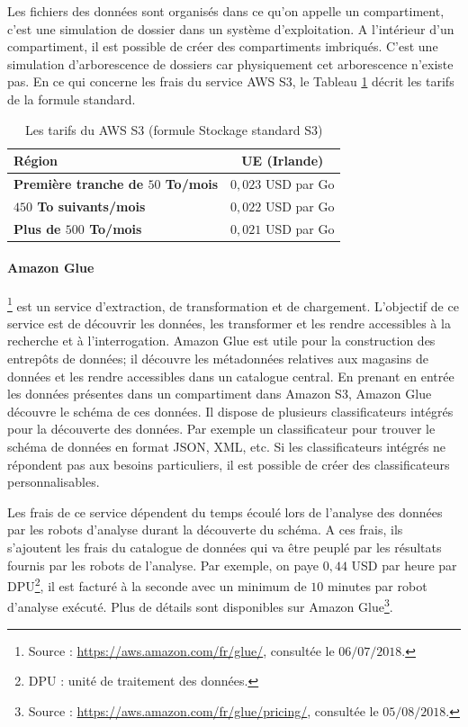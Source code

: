 Les fichiers des données sont organisés dans ce qu'on appelle un compartiment, c'est une simulation de dossier dans un système d'exploitation. A l'intérieur d'un compartiment, il est possible de créer des compartiments imbriqués. C'est une simulation d'arborescence de dossiers car physiquement cet arborescence n'existe pas. En ce qui concerne les frais du service AWS S3, le Tableau   	\ref{tab:pricing-s3-standard} décrit les tarifs de la formule standard.
\begin{table}[H]
	\centering
	\captionsetup{justification=centering}
	\begin{tabular}{l c }
		\textbf{Région} & UE (Irlande) \\ \hline
		\textbf{Première tranche de $ 50 $ To/mois} &	$ 0,023 $ USD par Go\\ \hline
		\textbf{$ 450 $ To suivants/mois} &	$ 0,022 $ USD par Go \\ \hline
		\textbf{Plus de $ 500 $ To/mois} &	$ 0,021 $ USD par Go\\ \hline
	\end{tabular}
	\caption{Les tarifs du AWS S3 (formule Stockage standard S3)}
	\label{tab:pricing-s3-standard}
\end{table}


\paragraph{Amazon  Glue} \label{aws:glue}
\footnote{Source : \url{https://aws.amazon.com/fr/glue/}, consultée le $06/07/2018$.} est un service d'extraction, de transformation et de chargement. L'objectif de ce service est de découvrir les données, les transformer et les rendre accessibles à la recherche et à l'interrogation.  Amazon Glue  est utile pour la construction des entrepôts de données; il découvre les métadonnées relatives aux magasins de données et les rendre accessibles dans un catalogue central. En prenant en entrée les données  présentes dans un compartiment dans Amazon S3, Amazon Glue découvre le schéma de ces données. Il dispose de plusieurs classificateurs intégrés pour la découverte des données. Par exemple un classificateur pour trouver le schéma  de données en format JSON, XML, etc. Si les classificateurs intégrés ne répondent pas aux besoins particuliers, il est possible de créer des classificateurs personnalisables. 

Les frais de ce service dépendent du temps écoulé lors de l'analyse des données par les robots d'analyse durant la découverte du schéma. A ces frais, ils s'ajoutent les frais du catalogue de données qui va être peuplé par les résultats fournis par les robots de l'analyse. Par exemple, on paye $ 0,44 $ USD par heure par DPU\footnote{DPU : unité de traitement des données.}, il est facturé à la seconde avec un minimum de $ 10 $ minutes par robot d'analyse exécuté. Plus de détails sont disponibles sur Amazon Glue\footnote{Source : \url{https://aws.amazon.com/fr/glue/pricing/}, consultée le $05/08/2018$.}.


